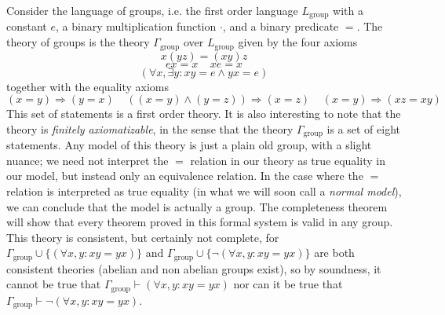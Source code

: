 \begin{example}
    Consider the language of groups, i.e. the first order language $L_{\text{group}}$ with a constant $e$, a binary multiplication function $\cdot$, and a binary predicate $=$. The theory of groups is the theory $\Gamma_{\text{group}}$ over $L_{\text{group}}$ given by the four axioms
    \[ x(yz) = (xy)z \]
    \[ ex = x\ \ \ \ \ xe = x \]
    \[ (\forall x, \exists y: xy = e \wedge yx = e) \]
    together with the equality axioms
    \[ (x = y) \Rightarrow (y = x)\ \ \ \ \ ((x = y) \wedge (y = z)) \Rightarrow (x = z)\ \ \ \ \ (x = y) \Rightarrow (xz = xy) \]
    This set of statements is a first order theory. It is also interesting to note that the theory is \emph{finitely axiomatizable}, in the sense that the theory $\Gamma_{\text{group}}$ is a set of eight statements. Any model of this theory is just a plain old group, with a slight nuance; we need not interpret the $=$ relation in our theory as true equality in our model, but instead only an equivalence relation. In the case where the $=$ relation is interpreted as true equality (in what we will soon call a \emph{normal model}), we can conclude that the model is actually a group. The completeness theorem will show that every theorem proved in this formal system is valid in any group. This theory is consistent, but certainly not complete, for $\Gamma_{\text{group}} \cup \{ (\forall x,y: xy = yx) \}$ and $\Gamma_{\text{group}} \cup \{ \neg (\forall x,y: xy = yx) \}$ are both consistent theories (abelian and non abelian groups exist), so by soundness, it cannot be true that $\Gamma_{\text{group}} \vdash (\forall x,y: xy = yx)$ nor can it be true that $\Gamma_{\text{group}} \vdash \neg (\forall x,y: xy = yx)$.
\end{example}

